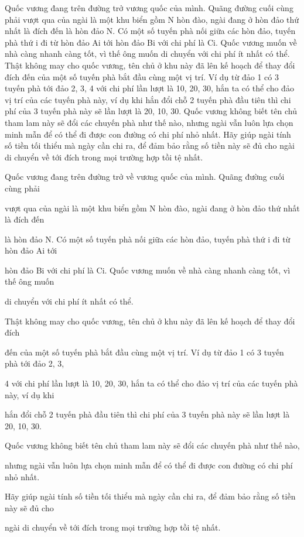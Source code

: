 Quốc vương đang trên đường trở vương quốc của mình. Quãng đường cuối cùng phải       vượt qua của ngài là một khu biển gồm N hòn đào, ngài đang ở hòn đảo thứ nhất là đích đến       là hòn đảo N. Có một số tuyến phà nối giữa các hòn đảo, tuyến phà thứ i đi từ hòn đảo Ai tới       hòn đảo Bi với chi phí là Ci. Quốc vương muốn về nhà càng nhanh càng tốt, vì thế ông muốn       di chuyển với chi phí ít nhất có thể.       Thật không may cho quốc vương, tên chủ ở khu này đã lên kế hoạch để thay đổi đích       đến của một số tuyến phà bắt đầu cùng một vị trí. Ví dụ từ đảo 1 có 3 tuyến phà tới đảo 2, 3,       4 với chi phí lần lượt là 10, 20, 30, hắn ta có thể cho đảo vị trí của các tuyến phà này, ví dụ khi       hắn đổi chỗ 2 tuyến phà đầu tiên thì chi phí của 3 tuyến phà này sẽ lần lượt là 20, 10, 30.       Quốc vương không biết tên chủ tham lam này sẽ đổi các chuyến phà như thế nào,       nhưng ngài vẫn luôn lựa chọn minh mẫn để có thể đi được con đường có chi phí nhỏ nhất.       Hãy giúp ngài tính số tiền tối thiểu mà ngày cần chi ra, để đảm bảo rằng số tiền này sẽ đủ cho       ngài di chuyển về tới đích trong mọi trường hợp tồi tệ nhất.    

   Quốc vương đang trên đường trở về vương quốc của mình. Quãng đường cuối cùng phải  

   vượt qua của ngài là một khu biển gồm N hòn đào, ngài đang ở hòn đảo thứ nhất là đích đến  

   là hòn đảo N. Có một số tuyến phà nối giữa các hòn đảo, tuyến phà thứ i đi từ hòn đảo Ai tới  

   hòn đảo Bi với chi phí là Ci. Quốc vương muốn về nhà càng nhanh càng tốt, vì thế ông muốn  

   di chuyển với chi phí ít nhất có thể.  



   Thật không may cho quốc vương, tên chủ ở khu này đã lên kế hoạch để thay đổi đích  

   đến của một số tuyến phà bắt đầu cùng một vị trí. Ví dụ từ đảo 1 có 3 tuyến phà tới đảo 2, 3,  

   4 với chi phí lần lượt là 10, 20, 30, hắn ta có thể cho đảo vị trí của các tuyến phà này, ví dụ khi  

   hắn đổi chỗ 2 tuyến phà đầu tiên thì chi phí của 3 tuyến phà này sẽ lần lượt là 20, 10, 30.  

   Quốc vương không biết tên chủ tham lam này sẽ đổi các chuyến phà như thế nào,  

   nhưng ngài vẫn luôn lựa chọn minh mẫn để có thể đi được con đường có chi phí nhỏ nhất.  

   Hãy giúp ngài tính số tiền tối thiểu mà ngày cần chi ra, để đảm bảo rằng số tiền này sẽ đủ cho  

   ngài di chuyển về tới đích trong mọi trường hợp tồi tệ nhất.  



\
